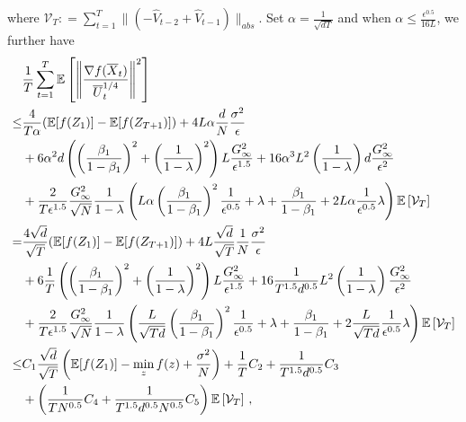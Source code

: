 \documentclass{article} %
\begin{document}
where $ \mathcal{V}_T : = \sum_{t=1}^{T}   \|    (- \hat V_{t-2} + \hat V_{t-1} ) \|_{abs}$.
Set $\alpha = \frac{1}{\sqrt{dT}}$ and when $\alpha  \leq \frac{\epsilon^{0.5}}{16L} $, we further have
\begin{align}\notag
& \frac{1}{T}\sum_{t=1}^T  \mathbb E \left [\left\|\frac{\nabla f( \overline X_{t})}{\overline U_{t}^{1/4}}\right\|^2  \right] \nonumber \\
\leq & \frac{4}{T\alpha} ( \mathbb E  [f( Z_{1})]  -  \mathbb E [f( Z_{T+1})]) +  {4L}\alpha  \frac{d}{N}
\frac{ \sigma^2 }{\epsilon}  \nonumber \\
&+  6\alpha^2 d \left(\left( \frac{\beta_1}{1-\beta_1}\right)^2 + \left (\frac{1}{1-\lambda} \right)^2 \right)L  \frac{G_{\infty}^2 }{\epsilon^{1.5}} +  {16}\alpha^3 L^2     \left( \frac{1}{1-\lambda}\right)d \frac{G_{\infty}^2}{\epsilon^2} \nonumber \\
& +   \frac{2}{T \epsilon^{1.5}}  \frac{G_{\infty}^2}{\sqrt{N}} \frac{1}{1-\lambda}  \left( L  \alpha \left ( \frac{\beta_1}{1-\beta_1} \right)^2     \frac{1}{{\epsilon^{0.5}}}  +   \lambda + \frac{\beta_1}{1-\beta_1} + 2L\alpha \frac{1}{\epsilon^{0.5}}\lambda   \right)   \mathbb E \left[ \mathcal{V}_T \right] \nonumber \\
= & \frac{4\sqrt{d}}{\sqrt{T}} ( \mathbb E  [f( Z_{1})]  -  \mathbb E [f( Z_{T+1})]) +  {4L}\frac{\sqrt{d}}{\sqrt{T}}  \frac{1}{N}
\frac{ \sigma^2 }{\epsilon}  \nonumber \\
&+  6
\frac{1}{T}  \left(\left( \frac{\beta_1}{1-\beta_1}\right)^2 + \left (\frac{1}{1-\lambda} \right)^2 \right)L  \frac{G_{\infty}^2 }{\epsilon^{1.5}} +  {16}\frac{1}{T^{1.5}d^{0.5}}L^2     \left( \frac{1}{1-\lambda}\right) \frac{G_{\infty}^2}{\epsilon^2} \nonumber \\
& +   \frac{2}{T \epsilon^{1.5}}  \frac{G_{\infty}^2}{\sqrt{N}} \frac{1}{1-\lambda}  \left( \frac{L}{\sqrt{Td}}  \left ( \frac{\beta_1}{1-\beta_1} \right)^2     \frac{1}{{\epsilon^{0.5}}}  +   \lambda + \frac{\beta_1}{1-\beta_1} + 2\frac{L}{\sqrt{Td}} \frac{1}{\epsilon^{0.5}}\lambda   \right)   \mathbb E \left[ \mathcal{V}_T \right] \nonumber \\
\leq  & C_1 \frac{\sqrt{d}}{\sqrt{T}} \left(\mathbb E  [f( Z_{1})]  - \min_{z} f(z)  + \frac{\sigma^2}{N}\right)  +  \frac{ 1}{T} C_2    + \frac{1}{T^{1.5}d^{0.5}} C_3 \nonumber \\ 
&+ \left(  \frac{1}{T N^{0.5} } C_4 + \frac{1}{T^{1.5}d^{0.5} N^{0.5}} C_5  \right) \mathbb E \left[ \mathcal{V}_T \right]  \, ,\nonumber
\end{align}
\end{document}
